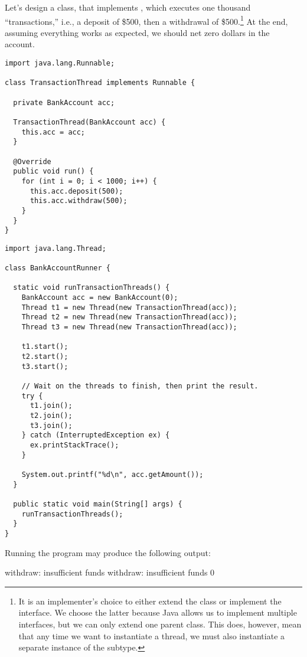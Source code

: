 Let's design a  class, that implements , which executes one thousand ``transactions,'' i.e., a deposit of \$500, then a withdrawal of \$500.\footnote{It is an implementer's choice to either extend the  class or implement the  interface. We choose the latter because Java allows us to implement multiple interfaces, but we can only extend one parent class. This does, however, mean that any time we want to instantiate a thread, we must also instantiate a separate instance of the  subtype.} At the end, assuming everything works as expected, we should net zero dollars in the account.

\begin{lstlisting}[language=MyJava]
import java.lang.Runnable;

class TransactionThread implements Runnable {

  private BankAccount acc;

  TransactionThread(BankAccount acc) { 
    this.acc = acc; 
  }

  @Override
  public void run() {
    for (int i = 0; i < 1000; i++) {
      this.acc.deposit(500);
      this.acc.withdraw(500);
    }
  }
}
\end{lstlisting}

\begin{lstlisting}[language=MyJava]
import java.lang.Thread;

class BankAccountRunner {

  static void runTransactionThreads() {
    BankAccount acc = new BankAccount(0);
    Thread t1 = new Thread(new TransactionThread(acc));
    Thread t2 = new Thread(new TransactionThread(acc));
    Thread t3 = new Thread(new TransactionThread(acc));

    t1.start();
    t2.start();
    t3.start();

    // Wait on the threads to finish, then print the result.
    try {
      t1.join();
      t2.join();
      t3.join();
    } catch (InterruptedException ex) { 
      ex.printStackTrace(); 
    }

    System.out.printf("%d\n", acc.getAmount());
  }

  public static void main(String[] args) {
    runTransactionThreads();
  }
}
\end{lstlisting}

Running the program may produce the following output:

\begin{verbnobox}[\small]
withdraw: insufficient funds
withdraw: insufficient funds
0
\end{verbnobox}

